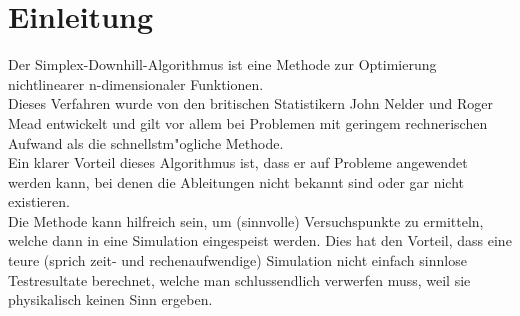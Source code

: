 \section{Einleitung}
Der Simplex-Downhill-Algorithmus ist eine Methode zur Optimierung nichtlinearer n-dimensionaler Funktionen.\\
Dieses Verfahren wurde von den britischen Statistikern John Nelder und Roger Mead entwickelt und gilt vor allem bei Problemen mit geringem rechnerischen Aufwand als die schnellstm"ogliche Methode.\\
Ein  klarer Vorteil dieses Algorithmus ist, dass er auf Probleme angewendet werden kann, bei denen  die Ableitungen nicht bekannt sind oder gar nicht existieren.\\
Die Methode kann hilfreich sein, um (sinnvolle) Versuchspunkte zu ermitteln, welche dann in eine Simulation eingespeist werden.
Dies hat den Vorteil, dass eine teure (sprich zeit- und rechenaufwendige) Simulation nicht einfach sinnlose Testresultate berechnet, welche man schlussendlich verwerfen muss, weil sie physikalisch keinen Sinn ergeben.
